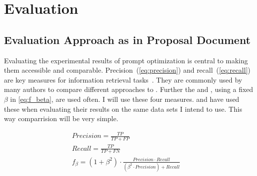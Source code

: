 
\chapter{Evaluation}
\label{ch:Evaluation}


\section{Evaluation Approach as in Proposal Document}
\label{approach:sec:evaluation}
Evaluating the experimental results of prompt optimization is central to making them accessible and comparable.
Precision~(\autoref{eq:precision}) and recall~(\autoref{eq:recall}) are key measures for information retrieval tasks~\cite{hayes2006AdvancingCandidate}.
They are commonly used by many authors to compare different approaches to \TLR.
Further the \fone and \ftwo, using a fixed $\beta$ in \autoref{eq:f_beta}, are used often.
I will use these four measures.
 and  have used these when evaluating their results on the same data sets I intend to use.
This way comparrision will be very simple.



\begin{align}
    \label{eq:precision}
    Precision = \frac{TP}{TP + FP} &\\
    \label{eq:recall}
    Recall = \frac{TP}{TP + FN} &\\
    \label{eq:f_beta}
    f_{\beta} = (1 + \beta^2) \cdot \frac{Precision \cdot Recall}{(\beta^2 \cdot Precision) + Recall}
\end{align}



